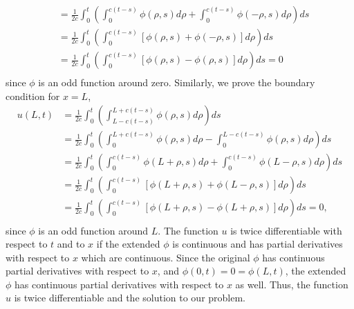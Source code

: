 \begin{questions}
\begin{solution}
\begin{align*}
&=\frac{1}{2c}\int_0^t\left(\int_0^{c(t-s)}\phi(\rho,s)d\rho+\int_0^{c(t-s)}\phi(-\rho,s)d\rho\right)ds\\
&=\frac{1}{2c}\int_0^t\left(\int_0^{c(t-s)}\left[\phi(\rho,s)+\phi(-\rho,s)\right]d\rho\right)ds\\
&=\frac{1}{2c}\int_0^t\left(\int_0^{c(t-s)}\left[\phi(\rho,s)-\phi(\rho,s)\right]d\rho\right)ds=0\\
\end{align*}
since $\phi$ is an odd function around zero. Similarly, we prove the boundary condition for $x=L$,
\begin{align*}
u(L,t)&=\frac{1}{2c}\int_0^t\left(\int_{L-c(t-s)}^{L+c(t-s)}\phi(\rho,s)d\rho\right)ds\\
&=\frac{1}{2c}\int_0^t\left(\int_0^{L+c(t-s)}\phi(\rho,s)d\rho-\int_0^{L-c(t-s)}\phi(\rho,s)d\rho\right)ds\\
&=\frac{1}{2c}\int_0^t\left(\int_0^{c(t-s)}\phi(L+\rho,s)d\rho+\int_0^{c(t-s)}\phi(L-\rho,s)d\rho\right)ds\\
&=\frac{1}{2c}\int_0^t\left(\int_0^{c(t-s)}\left[\phi(L+\rho,s)+\phi(L-\rho,s)\right]d\rho\right)ds\\
&=\frac{1}{2c}\int_0^t\left(\int_0^{c(t-s)}\left[\phi(L+\rho,s)-\phi(L+\rho,s)\right]d\rho\right)ds=0,\\
\end{align*}
since $\phi$ is an odd function around $L$. The function $u$ is twice differentiable with respect to $t$ and to $x$ if the extended $\phi$ is continuous and has partial derivatives with respect to $x$ which are continuous. Since the original $\phi$ has continuous partial derivatives with respect to $x$, and $\phi(0,t)=0=\phi(L,t)$, the extended $\phi$ has continuous partial derivatives with respect to $x$ as well. Thus, the function $u$ is twice differentiable and the solution to our problem.
\end{solution}

\end{questions}
